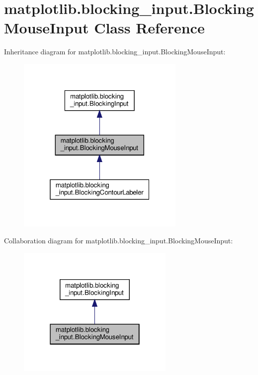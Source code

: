 \hypertarget{classmatplotlib_1_1blocking__input_1_1BlockingMouseInput}{}\section{matplotlib.\+blocking\+\_\+input.\+Blocking\+Mouse\+Input Class Reference}
\label{classmatplotlib_1_1blocking__input_1_1BlockingMouseInput}


Inheritance diagram for matplotlib.\+blocking\+\_\+input.\+Blocking\+Mouse\+Input\+:
\nopagebreak
\begin{figure}[H]
\begin{center}
\leavevmode
\includegraphics[width=229pt]{classmatplotlib_1_1blocking__input_1_1BlockingMouseInput__inherit__graph}
\end{center}
\end{figure}


Collaboration diagram for matplotlib.\+blocking\+\_\+input.\+Blocking\+Mouse\+Input\+:
\nopagebreak
\begin{figure}[H]
\begin{center}
\leavevmode
\includegraphics[width=214pt]{classmatplotlib_1_1blocking__input_1_1BlockingMouseInput__coll__graph}
\end{center}
\end{figure}

